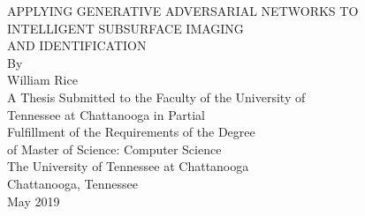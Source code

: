 \begin{titlepage}
    \thispagestyle{plain}
    \begin{center}
        \vspace{\baselineskip}
        \vspace{\baselineskip}
        \vspace{\baselineskip}
        \vspace{\baselineskip}
        \vspace{\baselineskip}
        APPLYING GENERATIVE ADVERSARIAL NETWORKS TO \\
        \vspace{\baselineskip}
        INTELLIGENT SUBSURFACE IMAGING\\
        \vspace{\baselineskip}
        AND IDENTIFICATION\\
        \vspace{\baselineskip}
        \vspace{\baselineskip}
        \vspace{\baselineskip}
        \vspace{\baselineskip}
        \vspace{\baselineskip}
        By \\
        \vspace{\baselineskip}
        William Rice\\
        \vspace{\baselineskip}
        \vspace{\baselineskip}
        \vspace{\baselineskip}
        \vspace{\baselineskip}
        \vspace{\baselineskip}
        A Thesis Submitted to the Faculty of the University of \\
        Tennessee at Chattanooga in Partial  \\
        Fulfillment of the Requirements of the Degree \\
        of Master of Science: Computer Science \\
        \vspace{\baselineskip}
        \vspace{\baselineskip}
        \vspace{\baselineskip}
        \vspace{\baselineskip}
        \vspace{\baselineskip}
        \vspace{\baselineskip}
        The University of Tennessee at Chattanooga \\
        Chattanooga, Tennessee \\
        \vspace{\baselineskip}
        May 2019 \\
        \setcounter{page}{2}
    \end{center}
\end{titlepage}